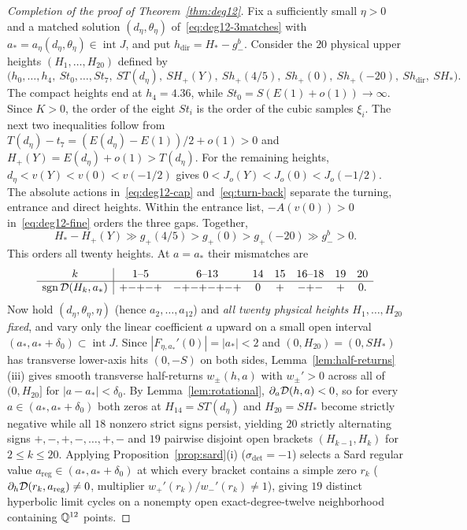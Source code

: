 \begin{proof}[Completion of the proof of Theorem~\ref{thm:deg12}]
Fix a sufficiently small $\eta>0$ and a matched solution $(d_\eta,\theta_\eta)$ of~\eqref{eq:deg12-3matches} with $a_*=a_\eta(d_\eta,\theta_\eta)\in\operatorname{int}J$, and put $h_{\mathrm{dir}}=H_*-g_-^b$. Consider the $20$ physical upper heights $(H_1,\dots,H_{20})$ defined by
\[
  \big(h_0,\dots,h_4,\ St_0,\dots,St_7,\ ST(d_\eta),\ SH_+(Y),\ S h_+(4/5),\ S h_+(0),\ S h_+(-20),\ Sh_{\mathrm{dir}},\ SH_*\big).
\]
The compact heights end at $h_4=4.36$, while
$St_0=S(E(1)+o(1))\to\infty$. Since $K>0$, the order of the eight
$St_i$ is the order of the cubic samples $\xi_i$. The next two
inequalities follow from
$T(d_\eta)-t_7=(E(d_\eta)-E(1))/2+o(1)>0$
and $H_+(Y)=E(d_\eta)+o(1)>T(d_\eta)$.
For the remaining heights,
$d_\eta<v(Y)<v(0)<v(-1/2)$ gives
$0<J_o(Y)<J_o(0)<J_o(-1/2)$. The absolute actions
in~\eqref{eq:deg12-cap} and~\eqref{eq:turn-back} separate the turning,
entrance and direct heights. Within the entrance list,
$-A(v(0))>0$ in~\eqref{eq:deg12-fine} orders the three gaps. Together,
\[
 H_*-H_+(Y)\gg g_+(4/5)>g_+(0)>g_+(-20)\gg g_-^b>0 .
\]
This orders all twenty heights. At $a=a_*$ their mismatches are
\[
\begin{array}{c|ccccccc}
k&1\text{--}5&6\text{--}13&14&15&16\text{--}18&19&20\\ \hline
\operatorname{sgn}\mathcal{D}(H_k,a_*)&{+}{-}{+}{-}{+}&{-}{+}{-}{+}{-}{+}{-}{+}&0&+&{-}{+}{-}&+&0 .
\end{array}
\]
Now hold $(d_\eta,\theta_\eta,\eta)$ (hence $a_2,\dots,a_{12}$) and \emph{all twenty physical heights $H_1,\dots,H_{20}$ fixed}, and vary only the linear coefficient $a$ upward on a small open interval $(a_*,a_*+\delta_0)\subset\operatorname{int}J$. Since $|F_{\eta,a_*}'(0)|=|a_*|<2$ and $(0,H_{20})=(0,SH_*)$ has transverse lower-axis hits $(0,-S)$ on both sides, Lemma~\ref{lem:half-returns}(iii) gives smooth transverse half-returns $w_\pm(h,a)$ with $w_\pm'>0$ across all of $(0,H_{20}]$ for $|a-a_*|<\delta_0$. By Lemma~\ref{lem:rotational}, $\partial_a\mathcal{D}(h,a)<0$, so for every $a\in(a_*,a_*+\delta_0)$ both zeros at $H_{14}=ST(d_\eta)$ and $H_{20}=SH_*$ become strictly negative while all $18$ nonzero strict signs persist, yielding $20$ strictly alternating signs $+,-,+,-,\dots,+,-$ and $19$ pairwise disjoint open brackets $(H_{k-1},H_k)$ for $2\le k\le20$. Applying Proposition~\ref{prop:sard}(i) ($\sigma_{\mathrm{det}}=-1$) selects a Sard regular value $a_{\mathrm{reg}}\in(a_*,a_*+\delta_0)$ at which every bracket contains a simple zero $r_k$ ($\partial_h\mathcal{D}(r_k,a_{\mathrm{reg}})\neq 0$, multiplier $w_+'(r_k)/w_-'(r_k)\neq 1$), giving $19$ distinct hyperbolic limit cycles on a nonempty open exact-degree-twelve neighborhood containing $\mathbb{Q}^{12}$ points.
\end{proof}

